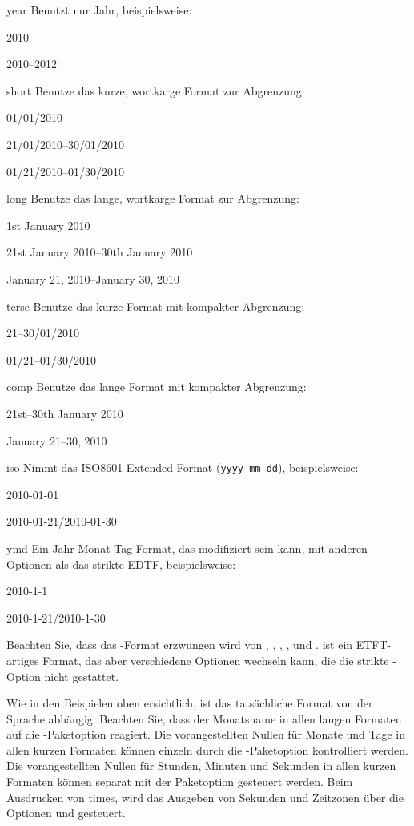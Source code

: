 \documentclass{ltxdockit}[2011/03/25]
\begin{document}
\begin{optionlist}
\begin{valuelist} 
\item[year] Benutzt nur Jahr, beispielsweise:\par
2010\par
2010--2012\par
\item[short] Benutze das kurze, wortkarge Format zur
Abgrenzung: \par 01/01/2010\par 21/01/2010--30/01/2010\par
01/21/2010--01/30/2010 
\item[long] Benutze das lange, wortkarge Format zur
Abgrenzung: \par 1st January 2010\par 21st January 2010--30th January 2010\par
January 21, 2010--January 30, 2010\par 
\item[terse] Benutze das kurze Format mit
kompakter Abgrenzung: \par 21--30/01/2010\par 01/21--01/30/2010 
\item[comp]
Benutze das lange Format mit kompakter Abgrenzung: \par 21st--30th January
2010\par January 21--30, 2010\par 
\item[iso] Nimmt das ISO8601 Extended Format (\texttt{yyyy-mm-dd}), 
    beispielsweise:\par
2010-01-01\par
2010-01-21/2010-01-30
\item[ymd] Ein Jahr-Monat-Tag-Format, das modifiziert sein kann, mit anderen
Optionen als das strikte EDTF, beispielsweise:\par
2010-1-1\par
2010-1-21/2010-1-30
\end{valuelist} 
%
Beachten Sie, dass das -Format erzwungen wird von , , , ,  und .  ist ein ETFT-artiges Format, das aber verschiedene Optionen wechseln kann, die die strikte -Option nicht gestattet.

Wie in den Beispielen oben ersichtlich, ist das tatsächliche Format von der
Sprache abhängig. Beachten Sie, dass der Monatsname in allen langen Formaten auf
die -Paketoption reagiert. Die vorangestellten Nullen für Monate und Tage in allen
kurzen Formaten können einzeln durch die -Paketoption
kontrolliert werden. Die vorangestellten Nullen für Stunden, Minuten und Sekunden in allen kurzen Formaten können separat mit der Paketoption 
gesteuert werden. Beim Ausdrucken von times, wird das Ausgeben von Sekunden und Zeitzonen über die Optionen  und  gesteuert.


\end{optionlist}
\end{document}
